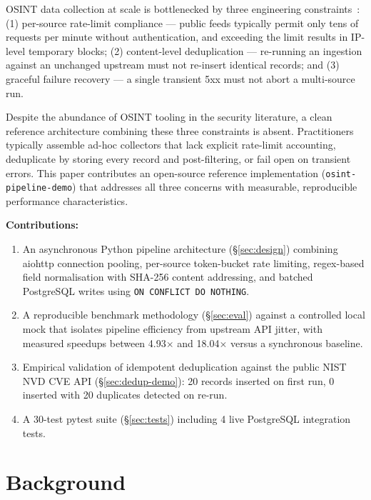 \documentclass[conference]{IEEEtran}
\begin{document}
OSINT data collection at scale is bottlenecked by three engineering
constraints~\cite{glassman2012osint}: (1) per-source rate-limit
compliance --- public feeds typically permit only tens of requests
per minute without authentication, and exceeding the limit results
in IP-level temporary blocks; (2) content-level deduplication ---
re-running an ingestion against an unchanged upstream must not
re-insert identical records; and (3) graceful failure recovery ---
a single transient 5xx must not abort a multi-source run.

Despite the abundance of OSINT tooling in the security literature,
a clean reference architecture combining these three constraints is
absent. Practitioners typically assemble ad-hoc collectors that lack
explicit rate-limit accounting, deduplicate by storing every record
and post-filtering, or fail open on transient errors. This paper
contributes an open-source reference implementation
(\texttt{osint-pipeline-demo}) that addresses all three concerns
with measurable, reproducible performance characteristics.

\textbf{Contributions:}

\begin{enumerate}
  \item An asynchronous Python pipeline architecture (\S\ref{sec:design})
        combining aiohttp connection pooling, per-source token-bucket
        rate limiting, regex-based field normalisation with SHA-256
        content addressing, and batched PostgreSQL writes using
        \texttt{ON CONFLICT DO NOTHING}.
  \item A reproducible benchmark methodology (\S\ref{sec:eval})
        against a controlled local mock that isolates pipeline
        efficiency from upstream API jitter, with measured speedups
        between 4.93$\times$ and 18.04$\times$ versus a synchronous
        baseline.
  \item Empirical validation of idempotent deduplication against
        the public NIST NVD CVE API (\S\ref{sec:dedup-demo}):
        20 records inserted on first run, 0 inserted with 20
        duplicates detected on re-run.
  \item A 30-test pytest suite (\S\ref{sec:tests}) including 4
        live PostgreSQL integration tests.
\end{enumerate}

\section{Background}
\label{sec:background}
\end{document}
